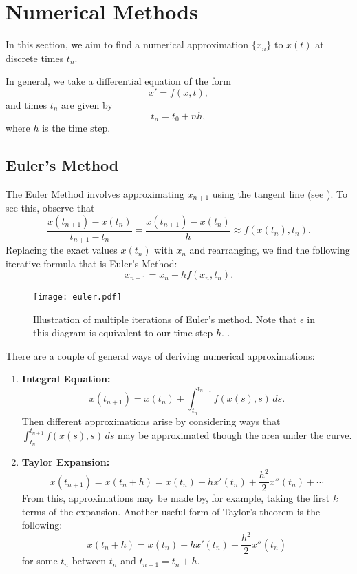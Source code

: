 \section{Numerical Methods}

In this section, we aim to find a numerical approximation $\{x_n\}$ to $x(t)$ at discrete times $t_n$.

In general, we take a differential equation of the form
\[
x' = f(x, t),
\]
and times $t_n$ are given by
\[
t_n = t_0 + nh,
\]
where $h$ is the time step.

\subsection{Euler's Method}

The Euler Method involves approximating $x_{n+1}$ using the tangent line (see ). To see this, observe that
\[
\frac{x(t_{n+1}) - x(t_n)}{t_{n+1} - t_n} = \frac{x(t_{n+1}) - x(t_n)}{h} \approx f(x(t_n), t_n).
\]
Replacing the exact values $x(t_n)$ with $x_n$ and rearranging, we find the following iterative formula that is Euler's Method:
\begin{equation}\label{eq:euler}
	x_{n+1} = x_n + h f(x_n, t_n).
\end{equation}

\begin{figure}[!ht]
	\centering
	\texttt{[image: euler.pdf]}
	\caption{Illustration of multiple iterations of Euler's method. Note that $\epsilon$ in this diagram is equivalent to our time step $h$. \cite[Figure 2]{numgraph}.}
	\label{fig:euler}
\end{figure}

There are a couple of general ways of deriving numerical approximations:
\begin{enumerate}
	\item{\textbf{Integral Equation:} \[x(t_{n+1}) = x(t_n) + \int_{t_n}^{t_{n+1}} f(x(s), s) \,ds.\] Then different approximations arise by considering ways that $\int_{t_n}^{t_{n+1}} f(x(s), s) \,ds$ may be approximated though the area under the curve.}
	\item{\textbf{Taylor Expansion:} \[x(t_{n+1}) = x(t_n + h) = x(t_n) + hx'(t_n) + \frac{h^2}{2}x''(t_n) + \cdots\] From this, approximations may be made by, for example, taking the first $k$ terms of the expansion. Another useful form of Taylor's theorem is the following: \[x(t_n + h) = x(t_n) + hx'(t_n) + \frac{h^2}{2}x''(\overline{t}_n)\] for some $\overline{t}_n$ between $t_n$ and $t_{n+1}=t_n+h$.}
\end{enumerate}

